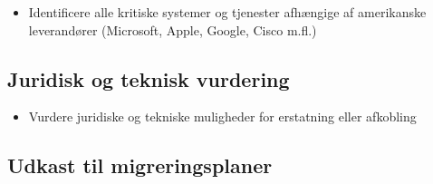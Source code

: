 \documentclass[a4paper,11pt,oneside]{book}
\def\tightlist{}
\begin{document}
\begin{itemize}
\tightlist
\item
  Identificere alle kritiske systemer og tjenester afhængige af
  amerikanske leverandører (Microsoft, Apple, Google, Cisco m.fl.)
\end{itemize}

\subsection{Juridisk og teknisk
vurdering}\label{juridisk-og-teknisk-vurdering}

\begin{itemize}
\tightlist
\item
  Vurdere juridiske og tekniske muligheder for erstatning eller
  afkobling
\end{itemize}

\subsection{Udkast til
migreringsplaner}\label{udkast-til-migreringsplaner}
\end{document}
